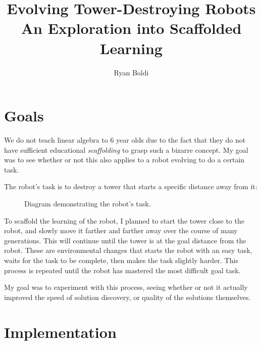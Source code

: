 \documentclass[12pt, a4paper]{article}
\title{Evolving Tower-Destroying Robots\\\normalsize An Exploration into Scaffolded Learning}
\author{Ryan Boldi}
\begin{document}
\maketitle
\tableofcontents
\newpage
\section{Goals}
We do not teach linear algebra to 6 year olds due to the fact that they do not have sufficient educational \emph{scaffolding} to grasp such a bizarre concept. My goal was to see whether or not this also applies to a robot evolving to do a certain task.\par 
The robot's task is to destroy a tower that starts a specific distance away from it:\par
\vspace{-10pt}
\begin{figure}[h]
	
\begin{center}
	\centering
{}
\caption{Diagram demonstrating the robot's task.}
\label{goal}
\end{center}
\end{figure}
\vspace{-10pt}
To scaffold the learning of the robot, I planned to start the tower close to the robot, and slowly move it farther and farther away over the course of many generations. This will continue until the tower is at the goal distance from the robot. These are environmental changes that starts the robot with an easy task, waits for the task to be complete, then makes the task slightly harder. This process is repeated until the robot has mastered the most difficult goal task.\par
My goal was to experiment with this process, seeing whether or not it actually improved the speed of solution discovery, or quality of the solutions themselves.
\newpage

\section{Implementation}
\end{document}
